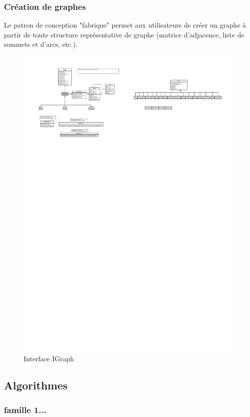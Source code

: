 \documentclass[french]{article}
\begin{document}
			\subsubsection{Création de graphes}
			Le patron de conception "fabrique" permet aux utilisateurs de créer un graphe à partir de toute structure représentative de graphe (matrice d'adjacence, liste de sommets et d'arcs, etc.).
			\begin{figure}[H]
				\centering
				\includegraphics[scale=3.0]{Conception/igraph.pdf}
				\caption{Interface IGraph}
			\end{figure}
			
		
		\subsection{Algorithmes}
			\subsubsection{famille 1...}
\end{document}
